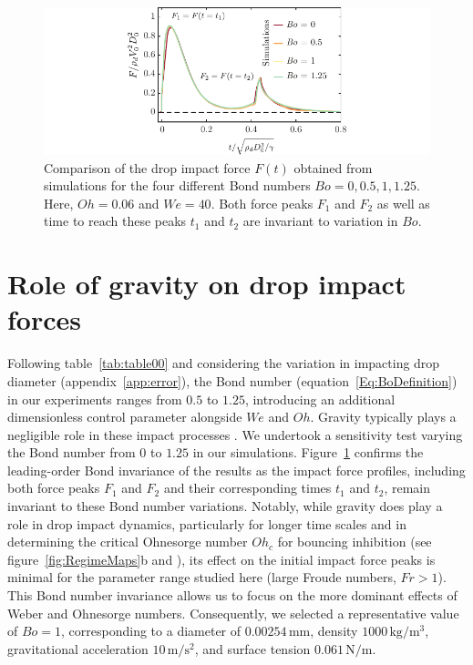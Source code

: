 \documentclass{jfm}
\newcommand{\oo}{\color{magenta} \normalfont}
\newcommand{\bb}{\color{black} \normalfont}
\begin{document}
\begin{figure}
	\centering
	\includegraphics[width=\textwidth]{Figures/figureA1.pdf}
	\caption{{\oo Comparison of the drop impact force $F(t)$ obtained from simulations for the four different Bond numbers $Bo = 0, 0.5, 1, 1.25$. Here, $Oh = 0.06$ and $We = 40$. Both force peaks $F_1$ and $F_2$ as well as time to reach these peaks $t_1$ and $t_2$ are invariant to variation in $Bo$. \bb}}
	\label{fig:AppGravity}
\end{figure}

\oo 

\section{Role of gravity on drop impact forces}
\label{app:gravity}

Following table~\ref{tab:table00} and considering the variation in impacting drop diameter (appendix~\ref{app:error}), the Bond number (equation~\eqref{Eq:BoDefinition}) in our experiments ranges from $0.5$ to $1.25$, introducing an additional dimensionless control parameter alongside $We$ and $Oh$. 
Gravity typically plays a negligible role in these impact processes \citep{sanjay_chantelot_lohse_2023,sanjay2024PRL}. We undertook a sensitivity test varying the Bond number from $0$ to $1.25$ in our simulations. 
Figure~\ref{fig:AppGravity} confirms the leading-order Bond invariance of the results as the impact force profiles, including both force peaks $F_1$ and $F_2$ and their corresponding times $t_1$ and $t_2$, remain invariant to these Bond number variations.
Notably, while gravity does play a role in drop impact dynamics, particularly for longer time scales and in determining the critical Ohnesorge number $Oh_c$ for bouncing inhibition (see figure~\ref{fig:RegimeMaps}b and \citet{sanjay_chantelot_lohse_2023}), its effect on the initial impact force peaks is minimal for the parameter range studied here (large Froude numbers, $Fr > 1$). This Bond number invariance allows us to focus on the more dominant effects of Weber and Ohnesorge numbers.
Consequently, we selected a representative value of $Bo = 1$, corresponding to a diameter of $0.00254\,\si{\milli\meter}$, density $1000\,\si{\kilogram/\meter^3}$, gravitational acceleration $10\,\si{\meter/\second^2}$, and surface tension $0.061\,\si{\newton/\meter}$. 
\bb



\end{document}
